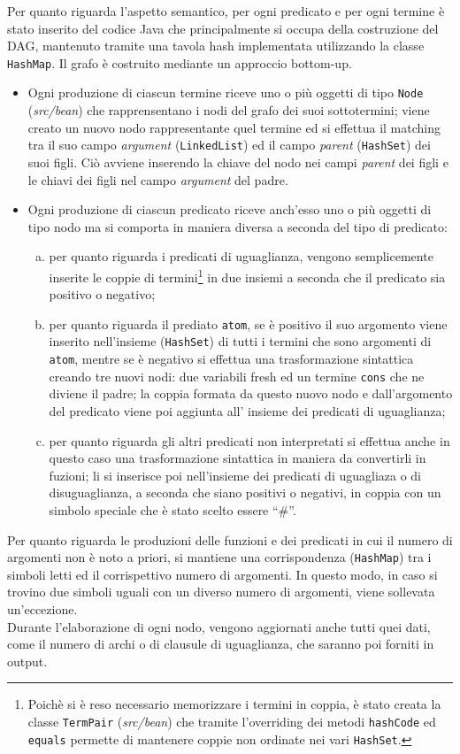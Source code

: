 \documentclass[a4paper,11pt]{article}
\begin{document}
\par
Per quanto riguarda l'aspetto semantico, per ogni predicato e per ogni 
termine è stato inserito del codice Java che principalmente si occupa 
della costruzione del DAG, mantenuto tramite una tavola hash 
implementata utilizzando la classe \texttt{HashMap}. Il grafo è 
costruito mediante un approccio bottom-up.
\begin{itemize}
\item Ogni produzione di ciascun termine riceve uno o più oggetti di tipo 
\texttt{Node} (\emph{src/bean}) che rapprensentano i nodi del grafo dei 
suoi sottotermini; viene creato un nuovo nodo rappresentante quel termine 
ed si effettua il matching tra il suo campo \emph{argument} 
(\texttt{LinkedList}) ed il campo \emph{parent} (\texttt{HashSet}) 
dei suoi figli. Ciò avviene inserendo la chiave del nodo nei campi 
\emph{parent} dei figli e le chiavi dei figli nel campo \emph{argument} 
del padre.
\item Ogni produzione di ciascun predicato riceve anch'esso uno o più 
oggetti di tipo nodo ma si comporta in maniera diversa a seconda del 
tipo di predicato:
\begin{enumerate}[a)]
\item per quanto riguarda i predicati di uguaglianza, vengono 
semplicemente inserite le coppie di termini\footnote{Poichè si è reso 
necessario memorizzare i termini in coppia, è stato creata la classe 
\texttt{TermPair} (\emph{src/bean}) che tramite l'overriding dei 
metodi \texttt{hashCode} ed \texttt{equals} permette di mantenere coppie 
non ordinate nei vari \texttt{HashSet}.} in due insiemi a seconda che 
il predicato sia positivo o negativo;
\item per quanto riguarda il prediato \texttt{atom}, se è positivo 
il suo argomento viene inserito nell'insieme (\texttt{HashSet}) di tutti 
i termini che sono argomenti di \texttt{atom}, mentre se è negativo si effettua una 
trasformazione sintattica creando tre nuovi nodi: due variabili fresh 
ed un termine \texttt{cons} che ne diviene il padre; la coppia formata da 
questo nuovo nodo e dall'argomento del predicato viene poi aggiunta all'
insieme dei predicati di uguaglianza;
\item per quanto riguarda gli altri predicati non interpretati si 
effettua anche in questo caso una trasformazione sintattica in maniera 
da convertirli in fuzioni; li si inserisce poi nell'insieme dei 
predicati di uguagliaza o di disuguaglianza, a seconda che siano 
positivi o negativi, in coppia con un simbolo speciale che è stato 
scelto essere “\#”.
\end{enumerate}
\end{itemize}
\par
Per quanto riguarda le produzioni delle funzioni e dei predicati in cui 
il numero di argomenti non è noto a priori, si mantiene una corrispondenza 
(\texttt{HashMap}) tra i simboli letti ed il corrispettivo numero di 
argomenti. In questo modo, in caso si trovino due simboli uguali con un 
diverso numero di argomenti, viene sollevata un'eccezione.\\ 
Durante l'elaborazione di ogni nodo, vengono aggiornati anche tutti 
quei dati, come il numero di archi o di clausule di uguaglianza, che 
saranno poi forniti in output.
 
\end{document}
